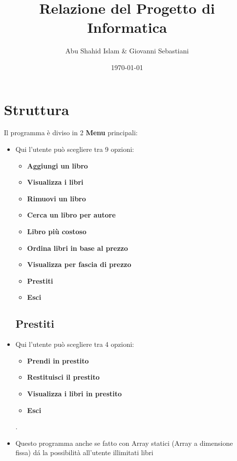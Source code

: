 \documentclass[a4paper,12pt]{article}
\title{Relazione del Progetto di Informatica}
\author{Abu Shahid Islam \& Giovanni Sebastiani}
\date{\today}
\begin{document}
\maketitle

\newpage

\small{\tableofcontents} %

\newpage

\section{Struttura} 
Il programma è diviso in 2 \textbf{Menu} principali:
\begin{itemize}
    \subsection{Menu Principale}
        \item Qui l'utente può scegliere tra 9 opzioni: \begin{itemize}
        \item \textbf{Aggiungi un libro}
        \item \textbf{Visualizza i libri}
        \item \textbf{Rimuovi un libro}
        \item \textbf{Cerca un libro per autore}
        \item \textbf{Libro più costoso}
        \item \textbf{Ordina libri in base al prezzo}
        \item \textbf{Visualizza per fascia di prezzo}
        \item \textbf{Prestiti}
        \item \textbf{Esci}
    \end{itemize}
    \subsection{Prestiti}
    \item Qui l'utente può scegliere tra 4 opzioni: \begin{itemize}
        \item \textbf{Prendi in prestito}
        \item \textbf{Restituisci il prestito}
        \item \textbf{Visualizza i libri in prestito}
        \item \textbf{Esci}
    \end{itemize}.
    \item Questo programma anche se fatto con Array statici (Array a dimensione fissa) dá la possibilità all'utente illimitati libri
\end{itemize}
\end{document}

